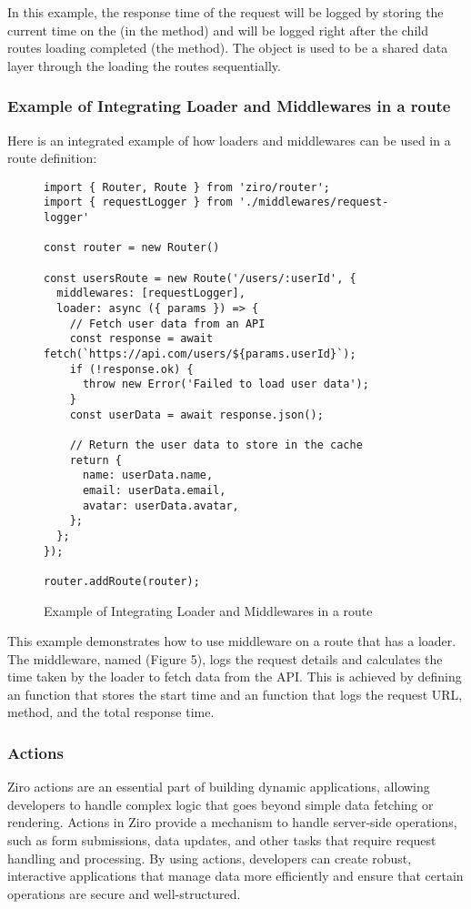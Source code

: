 In this example, the response time of the request will be logged by storing the current time on the  (in the  method) and will be logged right after the child routes loading completed (the  method). The  object is used to be a shared data layer through the loading the routes sequentially.

\pagebreak
\subsubsection*{Example of Integrating Loader and Middlewares in a route}
Here is an integrated example of how loaders and middlewares can be used in a route definition:

\begin{figure}[h!]
\begin{verbatim}
import { Router, Route } from 'ziro/router';
import { requestLogger } from './middlewares/request-logger'

const router = new Router()

const usersRoute = new Route('/users/:userId', {
  middlewares: [requestLogger],
  loader: async ({ params }) => {
    // Fetch user data from an API
    const response = await fetch(`https://api.com/users/${params.userId}`);
    if (!response.ok) {
      throw new Error('Failed to load user data');
    }
    const userData = await response.json();

    // Return the user data to store in the cache
    return {
      name: userData.name,
      email: userData.email,
      avatar: userData.avatar,
    };
  };
});

router.addRoute(router);
\end{verbatim}
\caption{Example of Integrating Loader and Middlewares in a route}
\end{figure}

This example demonstrates how to use middleware on a route that has a loader. The middleware, named  (Figure 5), logs the request details and calculates the time taken by the loader to fetch data from the API. This is achieved by defining an  function that stores the start time and an  function that logs the request URL, method, and the total response time.


\subsubsection{Actions}
Ziro actions are an essential part of building dynamic applications, allowing developers to handle complex logic that goes beyond simple data fetching or rendering. Actions in Ziro provide a mechanism to handle server-side operations, such as form submissions, data updates, and other tasks that require request handling and processing. By using actions, developers can create robust, interactive applications that manage data more efficiently and ensure that certain operations are secure and well-structured.

